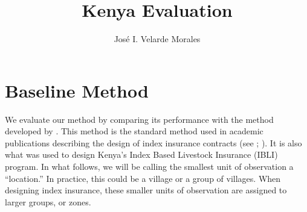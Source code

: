 \documentclass[11pt]{article}
\title{Kenya Evaluation}
\author{José I. Velarde Morales}
\begin{document}
\maketitle

\section{Baseline Method}
We evaluate our method by comparing its performance with the method developed by \cite{chantarat2013designing}. This method is the standard method used in academic publications describing the design of index insurance contracts (see \cite{flatnes2018improving}; \cite{jensen2019does}). It is also what was used to design Kenya's Index Based Livestock Insurance (IBLI) program. In what follows, we will be calling the smallest unit of observation a ``location.'' In practice, this could be a village or a group of villages. When designing index insurance, these smaller units of observation are assigned to larger groups, or zones. 
\end{document}
